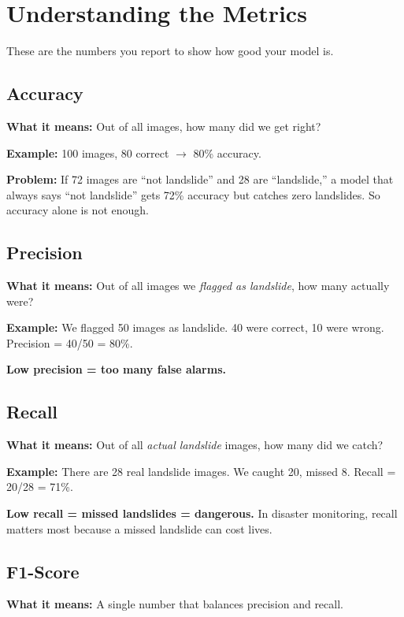 \documentclass[11pt]{article}
\begin{document}
\section{Understanding the Metrics}

These are the numbers you report to show how good your model is.

\subsection{Accuracy}

\textbf{What it means:} Out of all images, how many did we get right?

\textbf{Example:} 100 images, 80 correct $\to$ 80\% accuracy.

\textbf{Problem:} If 72 images are ``not landslide'' and 28 are ``landslide,'' a model that always says ``not landslide'' gets 72\% accuracy but catches zero landslides. So accuracy alone is not enough.

\subsection{Precision}

\textbf{What it means:} Out of all images we \textit{flagged as landslide}, how many actually were?

\textbf{Example:} We flagged 50 images as landslide. 40 were correct, 10 were wrong. Precision = 40/50 = 80\%.

\textbf{Low precision = too many false alarms.}

\subsection{Recall}

\textbf{What it means:} Out of all \textit{actual landslide} images, how many did we catch?

\textbf{Example:} There are 28 real landslide images. We caught 20, missed 8. Recall = 20/28 = 71\%.

\textbf{Low recall = missed landslides = dangerous.} In disaster monitoring, recall matters most because a missed landslide can cost lives.

\subsection{F1-Score}

\textbf{What it means:} A single number that balances precision and recall.
\end{document}
